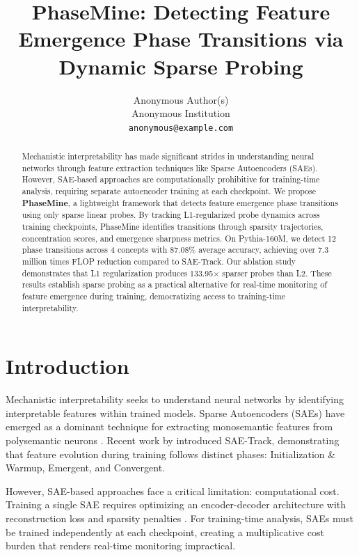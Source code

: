 \documentclass{article}
\title{PhaseMine: Detecting Feature Emergence Phase Transitions via Dynamic Sparse Probing}
\author{%
  Anonymous Author(s)\\
  Anonymous Institution\\
  \texttt{anonymous@example.com}
}
\date{}
\begin{document}
\maketitle

\begin{abstract}
Mechanistic interpretability has made significant strides in understanding neural networks through feature extraction techniques like Sparse Autoencoders (SAEs). However, SAE-based approaches are computationally prohibitive for training-time analysis, requiring separate autoencoder training at each checkpoint. We propose \textbf{PhaseMine}, a lightweight framework that detects feature emergence phase transitions using only sparse linear probes. By tracking L1-regularized probe dynamics across training checkpoints, PhaseMine identifies transitions through sparsity trajectories, concentration scores, and emergence sharpness metrics. On Pythia-160M, we detect 12 phase transitions across 4 concepts with 87.08\% average accuracy, achieving over 7.3 million times FLOP reduction compared to SAE-Track. Our ablation study demonstrates that L1 regularization produces 133.95$\times$ sparser probes than L2. These results establish sparse probing as a practical alternative for real-time monitoring of feature emergence during training, democratizing access to training-time interpretability.
\end{abstract}

\section{Introduction}

Mechanistic interpretability seeks to understand neural networks by identifying interpretable features within trained models. Sparse Autoencoders (SAEs) have emerged as a dominant technique for extracting monosemantic features from polysemantic neurons \cite{bricken2023towards, cunningham2023sparse, templeton2024scaling}. Recent work by \cite{oi2024tracking} introduced SAE-Track, demonstrating that feature evolution during training follows distinct phases: Initialization \& Warmup, Emergent, and Convergent.

However, SAE-based approaches face a critical limitation: computational cost. Training a single SAE requires optimizing an encoder-decoder architecture with reconstruction loss and sparsity penalties \cite{gao2024scaling}. For training-time analysis, SAEs must be trained independently at each checkpoint, creating a multiplicative cost burden that renders real-time monitoring impractical.
\end{document}
